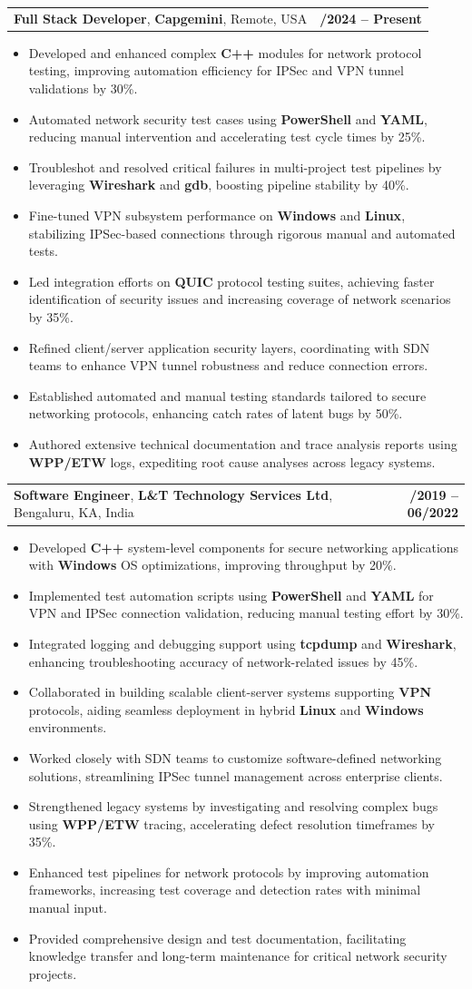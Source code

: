 \documentclass[letterpaper,11pt]{article}
\makeatletter
\newcommand{\resumeItem}[1]{
  \item\footnotesize{
    {#1 \vspace{-2pt}}
  }
}
\newcommand{\resumeSubheading}[4]{
  \vspace{-2pt}\item
    \begin{tabular*}{1.0\textwidth}[t]{l@{\extracolsep{\fill}}r}
      \textbf{\fontsize{10pt}{14pt}\selectfont #3}, \textbf{\fontsize{10pt}{14pt}\selectfont #1}, \fontsize{10pt}{14pt}\selectfont #4 & \textbf{\fontsize{10pt}{14pt}\selectfont #2} \\
    \end{tabular*}\vspace{-7pt}
}
\newcommand{\resumeItemListStart}{\begin{itemize}[leftmargin=*]}
\newcommand{\resumeItemListEnd}{\end{itemize}\vspace{-5pt}}
\makeatother
\begin{document}
    \resumeSubheading
        {Capgemini}{01/2024 -- Present}
        {Full Stack Developer}{Remote, USA}
      \resumeItemListStart
        \resumeItem{Developed and enhanced complex \textbf{C++} modules for network protocol testing, improving automation efficiency for IPSec and VPN tunnel validations by 30\%.}
        \resumeItem{Automated network security test cases using \textbf{PowerShell} and \textbf{YAML}, reducing manual intervention and accelerating test cycle times by 25\%.}
        \resumeItem{Troubleshot and resolved critical failures in multi-project test pipelines by leveraging \textbf{Wireshark} and \textbf{gdb}, boosting pipeline stability by 40\%.}
        \resumeItem{Fine-tuned VPN subsystem performance on \textbf{Windows} and \textbf{Linux}, stabilizing IPSec-based connections through rigorous manual and automated tests.}
        \resumeItem{Led integration efforts on \textbf{QUIC} protocol testing suites, achieving faster identification of security issues and increasing coverage of network scenarios by 35\%.}
        \resumeItem{Refined client/server application security layers, coordinating with SDN teams to enhance VPN tunnel robustness and reduce connection errors.}
        \resumeItem{Established automated and manual testing standards tailored to secure networking protocols, enhancing catch rates of latent bugs by 50\%.}
        \resumeItem{Authored extensive technical documentation and trace analysis reports using \textbf{WPP/ETW} logs, expediting root cause analyses across legacy systems.}
      \resumeItemListEnd

    \resumeSubheading
        {L\&T Technology Services Ltd}{08/2019 -- 06/2022}
        {Software Engineer}{Bengaluru, KA, India}
      \resumeItemListStart
        \resumeItem{Developed \textbf{C++} system-level components for secure networking applications with \textbf{Windows} OS optimizations, improving throughput by 20\%.}
        \resumeItem{Implemented test automation scripts using \textbf{PowerShell} and \textbf{YAML} for VPN and IPSec connection validation, reducing manual testing effort by 30\%.}
        \resumeItem{Integrated logging and debugging support using \textbf{tcpdump} and \textbf{Wireshark}, enhancing troubleshooting accuracy of network-related issues by 45\%.}
        \resumeItem{Collaborated in building scalable client-server systems supporting \textbf{VPN} protocols, aiding seamless deployment in hybrid \textbf{Linux} and \textbf{Windows} environments.}
        \resumeItem{Worked closely with SDN teams to customize software-defined networking solutions, streamlining IPSec tunnel management across enterprise clients.}
        \resumeItem{Strengthened legacy systems by investigating and resolving complex bugs using \textbf{WPP/ETW} tracing, accelerating defect resolution timeframes by 35\%.}
        \resumeItem{Enhanced test pipelines for network protocols by improving automation frameworks, increasing test coverage and detection rates with minimal manual input.}
        \resumeItem{Provided comprehensive design and test documentation, facilitating knowledge transfer and long-term maintenance for critical network security projects.}
      \resumeItemListEnd
\end{document}
